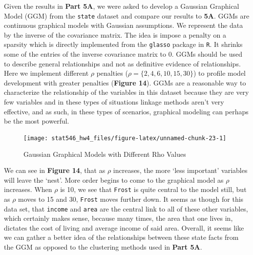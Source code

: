 \documentclass[]{article}
\begin{document}
Given the results in \textbf{Part 5A}, we were asked to develop a
Gaussian Graphical Model (GGM) from the \texttt{state} dataset and
compare our results to \textbf{5A}. GGMs are continuous graphical models
with Gaussian assumptions. We represent the data by the inverse of the
covariance matrix. The idea is impose a penalty on a sparsity which is
directly implemented from the \texttt{glasso} package in \texttt{R}. It
shrinks some of the entries of the inverse covariance matrix to 0. GGMs
should be used to describe general relationships and not as definitive
evidence of relationships. Here we implement different \(\rho\)
penalties (\(\rho=\{2, 4, 6, 10, 15, 30\}\)) to profile model
development with greater penalties (\textbf{Figure 14}). GGMs are a
reasonable way to characterize the relationship of the variables in this
dataset because they are very few variables and in these types of
situations linkage methods aren't very effective, and as such, in these
types of scenarios, graphical modeling can perhaps be the most powerful.

\begin{figure}

{\centering \texttt{[image: stat546\_hw4\_files/figure-latex/unnamed-chunk-23-1]} 

}

\caption{Gaussian Graphical Models with Different Rho Values}\label{fig:unnamed-chunk-23}
\end{figure}

We can see in \textbf{Figure 14}, that as \(\rho\) increases, the more
`less important' variables will leave the `nest'. More order begins to
come to the graphical model as \(\rho\) increases. When \(\rho\) is 10,
we see that \texttt{Frost} is quite central to the model still, but as
\(\rho\) moves to 15 and 30, \texttt{Frost} moves further down. It seems
as though for this data set, that \texttt{income} and \texttt{area} are
the central link to all of these other variables, which certainly makes
sense, because many times, the area that one lives in, dictates the cost
of living and average income of said area. Overall, it seems like we can
gather a better idea of the relationships between these state facts from
the GGM as opposed to the clustering methods used in \textbf{Part 5A}.
\end{document}
